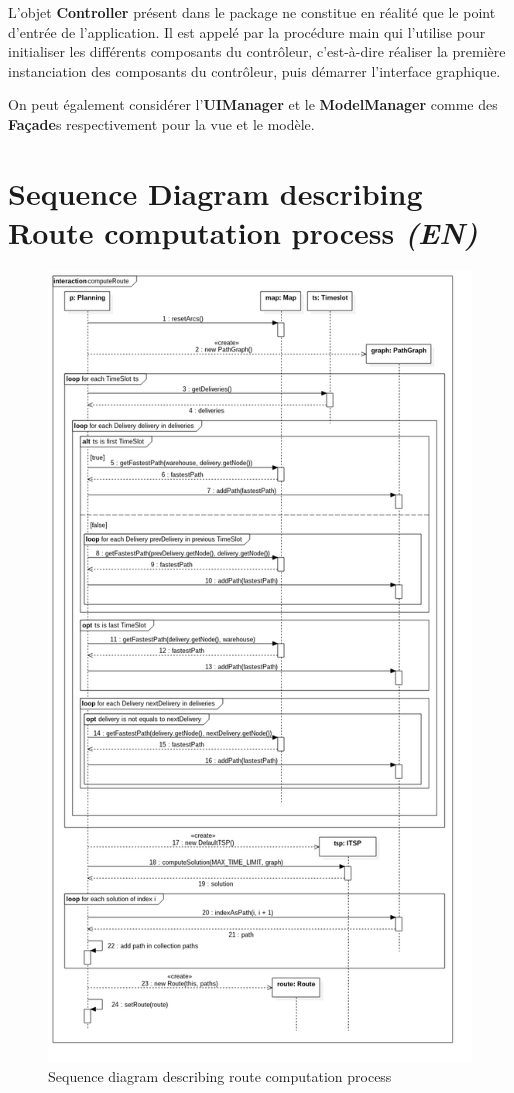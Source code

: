 \documentclass[paper=a4,fontsize=11pt]{report}
\numberwithin{equation}{section}		%
\numberwithin{figure}{section}		%
\numberwithin{table}{section}		%
\renewcommand{\bf}[1]{\textbf{#1}}
\renewcommand{\it}[1]{\textit{#1}}
\begin{document}
L'objet \bf{Controller} présent dans le package ne constitue en réalité que le point d'entrée de l'application. Il est appelé par la procédure main qui l'utilise pour initialiser les différents composants du contrôleur, c'est-à-dire réaliser la première instanciation des composants du contrôleur, puis démarrer l'interface graphique.

On peut également considérer l'\bf{UIManager} et le \bf{ModelManager} comme des \bf{Façade}s respectivement pour la vue et le modèle. 

\section{Sequence Diagram describing Route computation process \it{(EN)}}
\label{sec:sequence-diagram-describing-route-computation-process}

\begin{figure}[H]
\centering
\includegraphics[scale=0.35,angle=0]{figures/sequence-diagram-route-compute.png}
\caption{Sequence diagram describing route computation process}
\end{figure}
\end{document}
